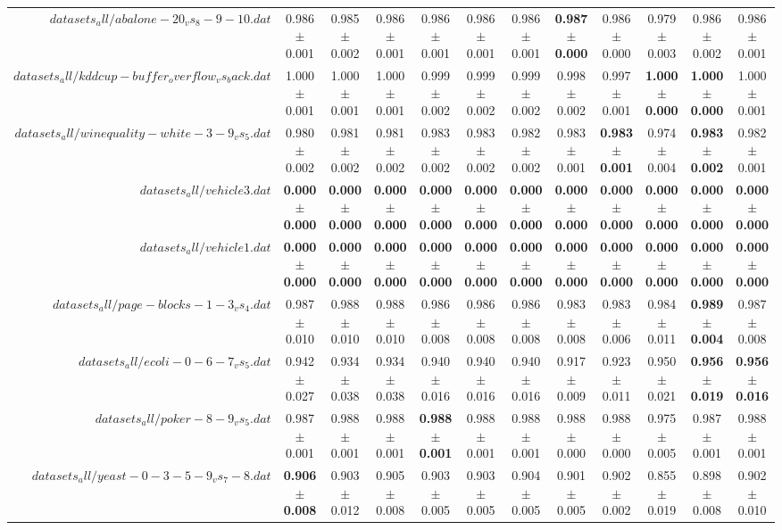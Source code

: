 \begin{table}[!ht]
{\begin{tabular}{r c c c c c c c c c c c}
$datasets_all/abalone-20_vs_8-9-10.dat$ & 0.986 $\pm$ 0.001 & 0.985 $\pm$ 0.002 & 0.986 $\pm$ 0.001 & 0.986 $\pm$ 0.001 & 0.986 $\pm$ 0.001 & 0.986 $\pm$ 0.001 & \textbf{0.987 $\pm$ 0.000} & 0.986 $\pm$ 0.000 & 0.979 $\pm$ 0.003 & 0.986 $\pm$ 0.002 & 0.986 $\pm$ 0.001 \\
$datasets_all/kddcup-buffer_overflow_vs_back.dat$ & 1.000 $\pm$ 0.001 & 1.000 $\pm$ 0.001 & 1.000 $\pm$ 0.001 & 0.999 $\pm$ 0.002 & 0.999 $\pm$ 0.002 & 0.999 $\pm$ 0.002 & 0.998 $\pm$ 0.002 & 0.997 $\pm$ 0.001 & \textbf{1.000 $\pm$ 0.000} & \textbf{1.000 $\pm$ 0.000} & 1.000 $\pm$ 0.001 \\
$datasets_all/winequality-white-3-9_vs_5.dat$ & 0.980 $\pm$ 0.002 & 0.981 $\pm$ 0.002 & 0.981 $\pm$ 0.002 & 0.983 $\pm$ 0.002 & 0.983 $\pm$ 0.002 & 0.982 $\pm$ 0.002 & 0.983 $\pm$ 0.001 & \textbf{0.983 $\pm$ 0.001} & 0.974 $\pm$ 0.004 & \textbf{0.983 $\pm$ 0.002} & 0.982 $\pm$ 0.001 \\
$datasets_all/vehicle3.dat$ & \textbf{0.000 $\pm$ 0.000} & \textbf{0.000 $\pm$ 0.000} & \textbf{0.000 $\pm$ 0.000} & \textbf{0.000 $\pm$ 0.000} & \textbf{0.000 $\pm$ 0.000} & \textbf{0.000 $\pm$ 0.000} & \textbf{0.000 $\pm$ 0.000} & \textbf{0.000 $\pm$ 0.000} & \textbf{0.000 $\pm$ 0.000} & \textbf{0.000 $\pm$ 0.000} & \textbf{0.000 $\pm$ 0.000} \\
$datasets_all/vehicle1.dat$ & \textbf{0.000 $\pm$ 0.000} & \textbf{0.000 $\pm$ 0.000} & \textbf{0.000 $\pm$ 0.000} & \textbf{0.000 $\pm$ 0.000} & \textbf{0.000 $\pm$ 0.000} & \textbf{0.000 $\pm$ 0.000} & \textbf{0.000 $\pm$ 0.000} & \textbf{0.000 $\pm$ 0.000} & \textbf{0.000 $\pm$ 0.000} & \textbf{0.000 $\pm$ 0.000} & \textbf{0.000 $\pm$ 0.000} \\
$datasets_all/page-blocks-1-3_vs_4.dat$ & 0.987 $\pm$ 0.010 & 0.988 $\pm$ 0.010 & 0.988 $\pm$ 0.010 & 0.986 $\pm$ 0.008 & 0.986 $\pm$ 0.008 & 0.986 $\pm$ 0.008 & 0.983 $\pm$ 0.008 & 0.983 $\pm$ 0.006 & 0.984 $\pm$ 0.011 & \textbf{0.989 $\pm$ 0.004} & 0.987 $\pm$ 0.008 \\
$datasets_all/ecoli-0-6-7_vs_5.dat$ & 0.942 $\pm$ 0.027 & 0.934 $\pm$ 0.038 & 0.934 $\pm$ 0.038 & 0.940 $\pm$ 0.016 & 0.940 $\pm$ 0.016 & 0.940 $\pm$ 0.016 & 0.917 $\pm$ 0.009 & 0.923 $\pm$ 0.011 & 0.950 $\pm$ 0.021 & \textbf{0.956 $\pm$ 0.019} & \textbf{0.956 $\pm$ 0.016} \\
$datasets_all/poker-8-9_vs_5.dat$ & 0.987 $\pm$ 0.001 & 0.988 $\pm$ 0.001 & 0.988 $\pm$ 0.001 & \textbf{0.988 $\pm$ 0.001} & 0.988 $\pm$ 0.001 & 0.988 $\pm$ 0.001 & 0.988 $\pm$ 0.000 & 0.988 $\pm$ 0.000 & 0.975 $\pm$ 0.005 & 0.987 $\pm$ 0.001 & 0.988 $\pm$ 0.001 \\
$datasets_all/yeast-0-3-5-9_vs_7-8.dat$ & \textbf{0.906 $\pm$ 0.008} & 0.903 $\pm$ 0.012 & 0.905 $\pm$ 0.008 & 0.903 $\pm$ 0.005 & 0.903 $\pm$ 0.005 & 0.904 $\pm$ 0.005 & 0.901 $\pm$ 0.005 & 0.902 $\pm$ 0.002 & 0.855 $\pm$ 0.019 & 0.898 $\pm$ 0.008 & 0.902 $\pm$ 0.010 \\
\end{tabular}}
\end{table}
